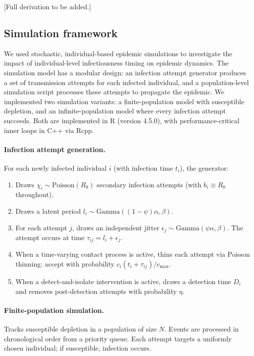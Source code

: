 \documentclass[10pt]{article}
\begin{document}
[Full derivation to be added.]


\subsection{Simulation framework}
\label{sec:supp_simulation}

We used stochastic, individual-based epidemic simulations to investigate the impact of individual-level infectiousness timing on epidemic dynamics. The simulation model has a modular design: an infection attempt generator produces a set of transmission attempts for each infected individual, and a population-level simulation script processes these attempts to propagate the epidemic. We implemented two simulation variants: a finite-population model with susceptible depletion, and an infinite-population model where every infection attempt succeeds. Both are implemented in R (version 4.5.0), with performance-critical inner loops in C++ via Rcpp.

\paragraph{Infection attempt generation.}
For each newly infected individual $i$ (with infection time $t_i$), the generator:
\begin{enumerate}
  \item Draws $\chi_i \sim \text{Poisson}(R_0)$ secondary infection attempts (with $b_i \equiv R_0$ throughout).
  \item Draws a latent period $l_i \sim \text{Gamma}((1-\psi)\alpha, \beta)$.
  \item For each attempt $j$, draws an independent jitter $\epsilon_j \sim \text{Gamma}(\psi\alpha, \beta)$. The attempt occurs at time $\tau_{ij} = l_i + \epsilon_j$.
  \item When a time-varying contact process is active, thins each attempt via Poisson thinning: accept with probability $c_i(t_i + \tau_{ij}) / c_\text{max}$.
  \item When a detect-and-isolate intervention is active, draws a detection time $D_i$ and removes post-detection attempts with probability $\eta$.
\end{enumerate}

\paragraph{Finite-population simulation.}
Tracks susceptible depletion in a population of size $N$. Events are processed in chronological order from a priority queue. Each attempt targets a uniformly chosen individual; if susceptible, infection occurs.
\end{document}
